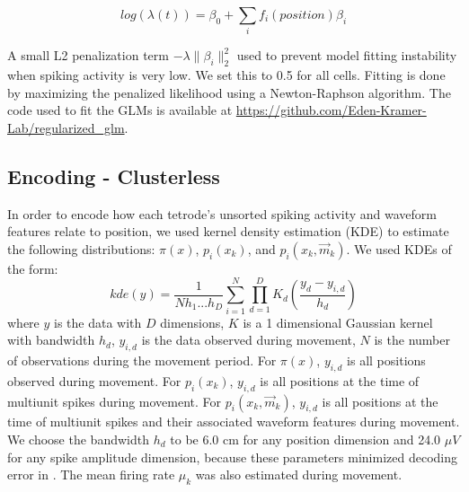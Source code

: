 \documentclass[times, twoside]{zHenriquesLab-StyleBioRxiv}
\begin{document}
$$log(\lambda(t)) = \beta_{0} + \sum_{i} f_{i}(position)\beta_{i}$$

A small L2 penalization term $-\lambda\|\beta_{i}\|_{2}^{2}$ used to prevent model fitting instability when spiking activity is very low. We set this to 0.5 for all cells. Fitting is done by maximizing the penalized likelihood using a Newton-Raphson algorithm. The code used to fit the GLMs is available at \url{https://github.com/Eden-Kramer-Lab/regularized_glm}.

\subsection*{Encoding - Clusterless}
In order to encode how each tetrode's unsorted spiking activity and waveform features relate to position, we used kernel density estimation (KDE) to estimate the following distributions: $\pi(x)$, $p_{i}(x_k)$, and $p_{i}(x_k, \vec{m}_k)$. We used KDEs of the form: 
$$
kde(y) = \frac{1}{N h_1...h_D} \sum^{N}_{i=1} \prod^{D}_{d=1} K_{d}\left(\frac{y_d - y_{i,d}}{h_d}\right)
$$
where $y$ is the data with $D$ dimensions, $K$ is a 1 dimensional Gaussian kernel with bandwidth $h_d$, $y_{i, d}$ is the data observed during movement, $N$ is the number of observations during the movement period. For $\pi(x)$, $y_{i, d}$ is all positions observed during movement. For $p_{i}(x_k)$, $y_{i, d}$ is all positions at the time of multiunit spikes during movement. For $p_{i}(x_k, \vec{m}_k)$, $y_{i, d}$ is all positions at the time of multiunit spikes and their associated waveform features during movement. We choose the bandwidth $h_d$ to be 6.0 cm for any position dimension and 24.0 $\mu V$ for any spike amplitude dimension, because these parameters minimized decoding error in \cite{KloostermanBayesiandecodingusing2014}. The mean firing rate $\mu_k$ was also estimated during movement.
\end{document}
